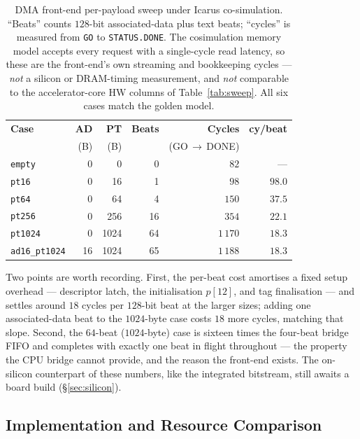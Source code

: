 \documentclass[11pt,a4paper]{article}
\begin{document}
\begin{table}[H]
\centering
\caption{DMA front-end per-payload sweep under Icarus co-simulation.
``Beats'' counts $128$-bit associated-data plus text beats; ``cycles''
is measured from \texttt{GO} to \texttt{STATUS.DONE}. The cosimulation
memory model accepts every request with a single-cycle read latency, so
these are the front-end's own streaming and bookkeeping cycles ---
\emph{not} a silicon or DRAM-timing measurement, and \emph{not}
comparable to the accelerator-core HW columns of Table~\ref{tab:sweep}.
All six cases match the golden model.}
\label{tab:dma-sweep}
\small
\begin{tabular}{lrrrrr}
\toprule
\rowcolor{tabhead!20}
\textbf{Case} & \textbf{AD} & \textbf{PT} & \textbf{Beats} &
\textbf{Cycles} & \textbf{cy/beat}\\
              & (B) & (B) & & (GO$\,\to\,$DONE) & \\
\midrule
\texttt{empty}        &  0 &    0 &  0 &    $82$  & ---\\
\texttt{pt16}         &  0 &   16 &  1 &    $98$  & $98.0$\\
\texttt{pt64}         &  0 &   64 &  4 &   $150$  & $37.5$\\
\texttt{pt256}        &  0 &  256 & 16 &   $354$  & $22.1$\\
\texttt{pt1024}       &  0 & 1024 & 64 & $1\,170$ & $18.3$\\
\texttt{ad16\_pt1024} & 16 & 1024 & 65 & $1\,188$ & $18.3$\\
\bottomrule
\end{tabular}
\end{table}

Two points are worth recording. First, the per-beat cost amortises a
fixed setup overhead --- descriptor latch, the initialisation $p[12]$,
and tag finalisation --- and settles around $18$ cycles per $128$-bit
beat at the larger sizes; adding one associated-data beat to the
$1024$-byte case costs $18$ more cycles, matching that slope. Second,
the $64$-beat ($1024$-byte) case is sixteen times the four-beat bridge
FIFO and completes with exactly one beat in flight throughout --- the
property the CPU bridge cannot provide, and the reason the front-end
exists. The on-silicon counterpart of these numbers, like the integrated
bitstream, still awaits a board build (§\ref{sec:silicon}).

\subsection{Implementation and Resource Comparison}
\end{document}
